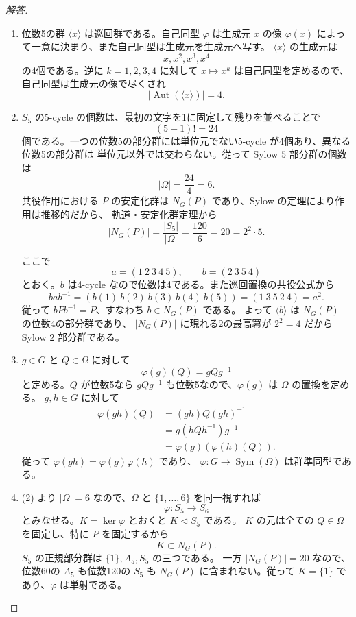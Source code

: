 \begin{proof}[解答]
\begin{enumerate}
  \item[(1)] 位数5の群 $\langle x\rangle$ は巡回群である。自己同型 $\varphi$ は生成元 $x$ の像
  $\varphi(x)$ によって一意に決まり、また自己同型は生成元を生成元へ写す。
  $\langle x\rangle$ の生成元は
  \[
  x,x^2,x^3,x^4
  \]
  の4個である。逆に $k=1,2,3,4$ に対して $x\mapsto x^k$ は自己同型を定めるので、
  自己同型は生成元の像で尽くされ
  \[
  |\operatorname{Aut}(\langle x\rangle)|=4.
  \]

  \item[(2)] $S_5$ の5-cycle の個数は、最初の文字を1に固定して残りを並べることで
  \[
  (5-1)!=24
  \]
  個である。一つの位数5の部分群には単位元でない5-cycle が4個あり、異なる位数5の部分群は
  単位元以外では交わらない。従って Sylow $5$ 部分群の個数は
  \[
  |\Omega|=\frac{24}{4}=6.
  \]
  共役作用における $P$ の安定化群は $N_G(P)$ であり、Sylow の定理により作用は推移的だから、
  軌道・安定化群定理から
  \[
  |N_G(P)|=\frac{|S_5|}{|\Omega|}
  =\frac{120}{6}=20=2^2\cdot5.
  \]

  ここで
  \[
  a=(1\ 2\ 3\ 4\ 5),
  \qquad b=(2\ 3\ 5\ 4)
  \]
  とおく。$b$ は4-cycle なので位数は4である。また巡回置換の共役公式から
  \[
  bab^{-1}
  =(b(1)\ b(2)\ b(3)\ b(4)\ b(5))
  =(1\ 3\ 5\ 2\ 4)=a^2.
  \]
  従って $bPb^{-1}=P$、すなわち $b\in N_G(P)$ である。
  よって $\langle b\rangle$ は $N_G(P)$ の位数4の部分群であり、
  $|N_G(P)|$ に現れる2の最高冪が $2^2=4$ だから Sylow $2$ 部分群である。

  \item[(3)] $g\in G$ と $Q\in\Omega$ に対して
  \[
  \varphi(g)(Q)=gQg^{-1}
  \]
  と定める。$Q$ が位数5なら $gQg^{-1}$ も位数5なので、$\varphi(g)$ は $\Omega$ の置換を定める。
  $g,h\in G$ に対して
  \begin{align*}
  \varphi(gh)(Q)
  &=(gh)Q(gh)^{-1}\\
  &=g(hQh^{-1})g^{-1}\\
  &=\varphi(g)(\varphi(h)(Q)).
  \end{align*}
  従って $\varphi(gh)=\varphi(g)\varphi(h)$ であり、
  $\varphi:G\to\operatorname{Sym}(\Omega)$ は群準同型である。

  \item[(4)] (2) より $|\Omega|=6$ なので、$\Omega$ と $\{1,\ldots,6\}$ を同一視すれば
  \[
  \varphi:S_5\longrightarrow S_6
  \]
  とみなせる。$K=\ker\varphi$ とおくと $K\triangleleft S_5$ である。
  $K$ の元は全ての $Q\in\Omega$ を固定し、特に $P$ を固定するから
  \[
  K\subset N_G(P).
  \]
  $S_5$ の正規部分群は $\{1\},A_5,S_5$ の三つである。
  一方 $|N_G(P)|=20$ なので、位数60の $A_5$ も位数120の $S_5$ も
  $N_G(P)$ に含まれない。従って $K=\{1\}$ であり、$\varphi$ は単射である。


\end{enumerate}
\end{proof}
